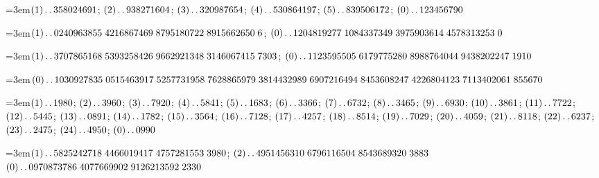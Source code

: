 \par\noindent\hangindent=3em\enspace $(1)\mathinner{.\,.}358024691$; $(2)\mathinner{.\,.}938271604$; $(3)\mathinner{.\,.}320987654$; $(4)\mathinner{.\,.}530864197$; $(5)\mathinner{.\,.}839506172$; $(0)\mathinner{.\,.}123456790$\par\smallskip

\par\noindent\hangindent=3em\enspace $(1)\mathinner{.\,.}0240963855\;\allowbreak 4216867469\;\allowbreak 8795180722\;\allowbreak 8915662650\;\allowbreak 6$; $(0)\mathinner{.\,.}1204819277\;\allowbreak 1084337349\;\allowbreak 3975903614\;\allowbreak 4578313253\;\allowbreak 0$\par\smallskip

\par\noindent\hangindent=3em\enspace $(1)\mathinner{.\,.}3707865168\;\allowbreak 5393258426\;\allowbreak 9662921348\;\allowbreak 3146067415\;\allowbreak 7303$; $(0)\mathinner{.\,.}1123595505\;\allowbreak 6179775280\;\allowbreak 8988764044\;\allowbreak 9438202247\;\allowbreak 1910$\par\smallskip

\par\noindent\hangindent=3em\enspace $(0)\mathinner{.\,.}1030927835\;\allowbreak 0515463917\;\allowbreak 5257731958\;\allowbreak 7628865979\;\allowbreak 3814432989\;\allowbreak 6907216494\;\allowbreak 8453608247\;\allowbreak 4226804123\;\allowbreak 7113402061\;\allowbreak 855670$\par\smallskip

\par\noindent\hangindent=3em\enspace $(1)\mathinner{.\,.}1980$; $(2)\mathinner{.\,.}3960$; $(3)\mathinner{.\,.}7920$; $(4)\mathinner{.\,.}5841$; $(5)\mathinner{.\,.}1683$; $(6)\mathinner{.\,.}3366$; $(7)\mathinner{.\,.}6732$; $(8)\mathinner{.\,.}3465$; $(9)\mathinner{.\,.}6930$; $(10)\mathinner{.\,.}3861$; $(11)\mathinner{.\,.}7722$; $(12)\mathinner{.\,.}5445$; $(13)\mathinner{.\,.}0891$; $(14)\mathinner{.\,.}1782$; $(15)\mathinner{.\,.}3564$; $(16)\mathinner{.\,.}7128$; $(17)\mathinner{.\,.}4257$; $(18)\mathinner{.\,.}8514$; $(19)\mathinner{.\,.}7029$; $(20)\mathinner{.\,.}4059$; $(21)\mathinner{.\,.}8118$; $(22)\mathinner{.\,.}6237$; $(23)\mathinner{.\,.}2475$; $(24)\mathinner{.\,.}4950$; $(0)\mathinner{.\,.}0990$\par\smallskip

\par\noindent\hangindent=3em\enspace $(1)\mathinner{.\,.}5825242718\;\allowbreak 4466019417\;\allowbreak 4757281553\;\allowbreak 3980$; $(2)\mathinner{.\,.}4951456310\;\allowbreak 6796116504\;\allowbreak 8543689320\;\allowbreak 3883$ $(0)\mathinner{.\,.}0970873786\;\allowbreak 4077669902\;\allowbreak 9126213592\;\allowbreak 2330$\par\smallskip

\par\endgroup
